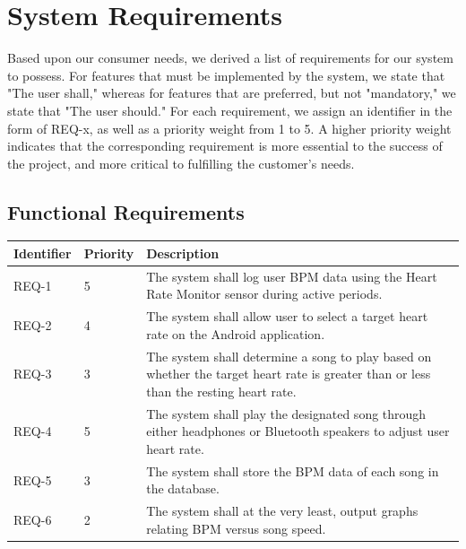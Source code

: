 \documentclass[letterpaper,english, 12pt]{scrreprt}
\begin{document}
\chapter{System Requirements}
Based upon our consumer needs, we derived a list of requirements for our system to
possess. For features that must be implemented by the system, we state that "The
user shall," whereas for features that are preferred, but not "mandatory," we state
that "The user should." For each requirement, we assign an identifier in the form of
REQ-x, as well as a priority weight from 1 to 5. A higher priority weight indicates
that the corresponding requirement is more essential to the success of the project,
and more critical to fulfilling the customer's needs.\\

\section{Functional Requirements}
\begin{center}
	\begin{tabular}{|C{2cm}|C{2cm}|C{8cm}|}
		\hline
			Identifier & Priority & Description\\
		\hline
			REQ-1 & 5 & The system shall log user BPM data using the Heart Rate Monitor sensor during active periods.\\
		\hline
			REQ-2 & 4 & The system shall allow user to select a target heart rate on the Android application.\\
		\hline
			REQ-3 & 3 & The system shall determine a song to play based on whether the target heart rate is greater than or less than the resting heart rate. \\
		\hline
			REQ-4 & 5 & The system shall play the designated song through either headphones or Bluetooth speakers to adjust user heart rate. \\
		\hline
			REQ-5 & 3 & The system shall store the BPM data of each song in the database. \\
		\hline
			REQ-6 & 2 & The system shall at the very least, output graphs relating BPM versus song speed.\\
        \hline
    \end{tabular}
\end{center}
\end{document}
